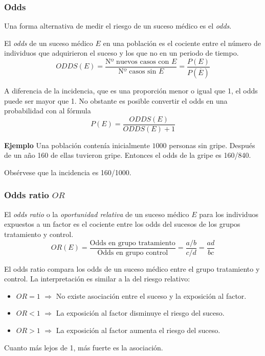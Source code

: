 \begin{frame}
\frametitle{Odds}
Una forma alternativa de medir el riesgo de un suceso médico es el \emph{odds}.

\begin{definition}[Odie]
El \emph{odds} de un suceso médico $E$ en una población es el cociente entre el número de individuos que adquirieron el suceso y los que no en un periodo de tiempo.
\[
	ODDS(E)=\frac{\mbox{Nº nuevos casos con $E$}}{\mbox{Nº casos sin $E$}}=\frac{P(E)}{P(\overline E)}
\]
\end{definition}

A diferencia de la incidencia, que es una proporción menor o igual que 1, el odds puede ser mayor que 1.
No obstante es posible convertir el odds en una probabilidad con al fórmula
\[
  P(E) = \frac{ODDS(E)}{ODDS(E)+1}
\]

\textbf{Ejemplo} Una población contenía inicialmente $1000$ personas sin gripe.
Después de un año 160 de ellas tuvieron gripe.
Entonces el odds de la gripe es 160/840.

Obsérvese que la incidencia es 160/1000.
\end{frame}
 

\begin{frame}
\frametitle{Odds ratio $OR$ }
\begin{definition}
El \emph{odds ratio} o la \emph{oportunidad relativa} de un suceso médico $E$ para los individuos expuestos a un factor es el cociente entre los odds del sucesos de los grupos tratamiento y control.
\[
  OR(E)=\frac{\mbox{Odds en grupo tratamiento}}{\mbox{Odds en grupo control}}=\frac{a/b}{c/d}=\frac{ad}{bc}
\]
\end{definition}

El odds ratio compara los odds de un suceso médico entre el grupo tratamiento y control.
La interpretación es similar a la del riesgo relativo:
\begin{itemize}
  \item $OR=1$ $\Rightarrow$ No existe asociación entre el suceso y la exposición al factor.
  \item $OR<1$ $\Rightarrow$ La exposición al factor disminuye el riesgo del suceso.
  \item $OR>1$ $\Rightarrow$ La exposición al factor aumenta el riesgo del suceso.
\end{itemize}
Cuanto más lejos de 1, más fuerte es la asociación. 
\end{frame}



